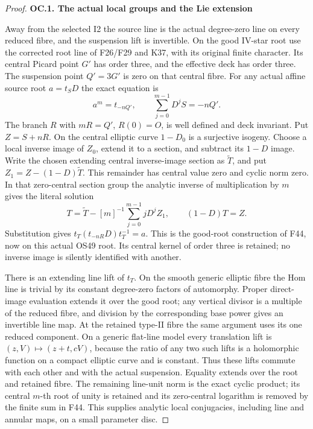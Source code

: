 \begin{proof}
\par

\medskip\noindent\textbf{OC.1. The actual local groups and the Lie extension}

\par\nobreak

Away from the selected I2 the source line is the actual degree-zero
line on every reduced fibre, and the suspension lift is invertible.
On the good IV-star root use the corrected root line of F26/F29 and
K37, with its original finite character. Its central Picard point
\(G'\) has order three, and the effective deck has order three.
The suspension point \(Q'=3G'\) is zero on that central fibre.
For any actual affine source root \(a=t_S D\) the exact equation is
\[
       a^m=t_{-nQ'},\qquad
       \sum_{j=0}^{m-1}D^jS=-nQ'.                         \tag{OC.1}
\]
The branch \(R\) with \(mR=Q'\), \(R(0)=O\), is
well defined and deck invariant. Put \(Z=S+nR\). On the central
elliptic curve \(1-D_0\) is a surjective isogeny. Choose a local
inverse image of \(Z_0\), extend it to a section, and subtract
its \(1-D\) image. Write the chosen extending central inverse-image section as
\(\widetilde T\), and put
\(Z_1=Z-(1-D)\widetilde T\). This remainder has central value zero
and cyclic norm zero. In that zero-central section group the analytic
inverse of multiplication by \(m\) gives the literal solution
\[
 T=\widetilde T-[m]^{-1}\sum_{j=0}^{m-1}jD^jZ_1,
                 \qquad (1-D)T=Z.                        \tag{OC.2}
\] Substitution
gives \(t_T(t_{-nR}D)t_T^{-1}=a\). This is the good-root
construction of F44, now on this actual OS49 root. Its central kernel
of order three is retained; no inverse image is silently identified
with another.

There is an extending line lift of \(t_T\). On the smooth
generic elliptic fibre the Hom line is trivial by its constant
degree-zero factors of automorphy. Proper direct-image evaluation
extends it over the good root; any vertical divisor is a multiple of
the reduced fibre, and division by the corresponding base power gives
an invertible line map. At the retained type-II fibre the same
argument uses its one reduced component. On a generic flat-line
model every translation lift is \((z,V)\mapsto(z+t,cV)\),
because the ratio of any two such lifts is a holomorphic function on
a compact elliptic curve and is constant. Thus these lifts commute
with each other and with the actual suspension. Equality extends
over the root and retained fibre. The remaining line-unit norm is
the exact cyclic product; its central \(m\)-th root of unity is
retained and its zero-central logarithm is removed by the finite sum
in F44. This supplies analytic local conjugacies, including line and
annular maps, on a small parameter disc.


\end{proof}
